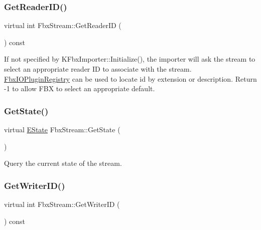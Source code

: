 \subsubsection{\texorpdfstring{Get\+Reader\+I\+D()}{GetReaderID()}}
{\footnotesize\ttfamily virtual int Fbx\+Stream\+::\+Get\+Reader\+ID (\begin{DoxyParamCaption}{ }\end{DoxyParamCaption}) const\hspace{0.3cm}{\ttfamily [pure virtual]}}

If not specified by K\+Fbx\+Importer\+::\+Initialize(), the importer will ask the stream to select an appropriate reader ID to associate with the stream. \hyperlink{class_fbx_i_o_plugin_registry}{Fbx\+I\+O\+Plugin\+Registry} can be used to locate id by extension or description. Return -\/1 to allow F\+BX to select an appropriate default. \mbox{\label{class_fbx_stream_a602172d138a0fc5c4cb3443b2b925296}} 
\subsubsection{\texorpdfstring{Get\+State()}{GetState()}}
{\footnotesize\ttfamily virtual \hyperlink{class_fbx_stream_adc469d38eb30339fa4190eb6c66ec8f7}{E\+State} Fbx\+Stream\+::\+Get\+State (\begin{DoxyParamCaption}{ }\end{DoxyParamCaption})\hspace{0.3cm}{\ttfamily [pure virtual]}}

Query the current state of the stream. \mbox{\label{class_fbx_stream_af39d714bf396c28252772b5d8e7caa47}} 
\subsubsection{\texorpdfstring{Get\+Writer\+I\+D()}{GetWriterID()}}
{\footnotesize\ttfamily virtual int Fbx\+Stream\+::\+Get\+Writer\+ID (\begin{DoxyParamCaption}{ }\end{DoxyParamCaption}) const\hspace{0.3cm}{\ttfamily [pure virtual]}}


